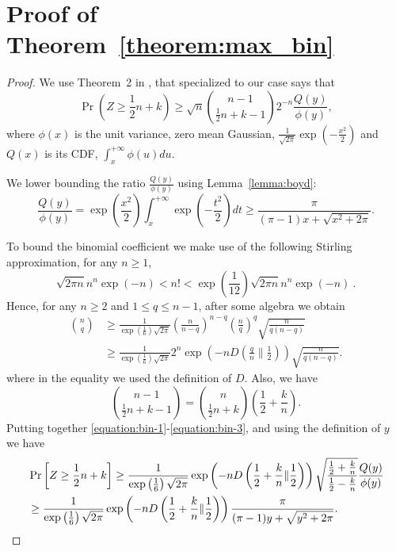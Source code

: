 \documentclass{article}
\begin{document}



\appendix

\section{Proof of Theorem~\ref{theorem:max_bin}}
\begin{proof}
We use Theorem~2 in \cite{McKay1989}, that specialized to our case says that
\begin{equation}
\label{equation:bin-1}
\Pr \left( Z \ge  \frac{1}{2} n + k  \right)
\ge \sqrt{n} \binom{n-1}{ \frac{1}{2} n + k -1} 2^{-n} \frac{Q(y)}{\phi(y)},
\end{equation}
where $\phi(x)$ is the unit variance, zero mean Gaussian, $\frac{1}{\sqrt{2 \pi}} \exp(-\frac{x^2}{2})$ and $Q(x)$ is its CDF, $\int_{x}^{+\infty} \phi(u) du$.

We lower bounding the ratio $\frac{Q(y)}{\phi(y)}$ using Lemma~\ref{lemma:boyd}:
\[
\frac{Q(y)}{\phi(y)}
= \exp\left(\frac{x^2}{2}\right) \int_{x}^{+\infty} \exp\left(-\frac{t^2}{2}\right) dt
\ge \frac{\pi}{(\pi-1)x+\sqrt{x^2+2 \pi}}.
\]

To bound the binomial coefficient we make use of the following Stirling approximation, for any $n\ge 1$,
\[
\sqrt{2 \pi n} n^n \exp(-n) < n! < \exp\left(\frac{1}{12}\right)\sqrt{2 \pi n} n^n \exp(-n)~.
\]
Hence, for any $n \ge 2$ and $1\le q \le n-1$, after some algebra we obtain
\begin{align*}
{n \choose q}
& \ge \frac{1}{\exp\left(\frac{1}{6}\right) \sqrt{2 \pi}} \left(\frac{n}{n-q}\right)^{n-q} \left(\frac{n}{q}\right)^{q} \sqrt{\frac{n}{q(n-q)}} \\
& \ge \frac{1}{\exp\left(\frac{1}{6}\right) \sqrt{2 \pi}} 2^n \exp\left(-n D\left(\frac{q}{n} \| \frac{1}{2}\right)\right) \sqrt{\frac{n}{q(n-q)}}.
\end{align*}
where in the equality we used the definition of $D$.
Also, we have
\begin{equation}
\label{equation:bin-3}
{n-1 \choose \frac{1}{2} n + k - 1} = {n \choose \frac{1}{2} n + k} \left(\frac{1}{2} + \frac{k}{n}\right) .
\end{equation}
Putting together \eqref{equation:bin-1}-\eqref{equation:bin-3}, and using the definition of $y$ we have
\begin{align*}
&\Pr\left[ Z \ge \frac{1}{2} n + k \right]
\ge \frac{1}{\exp\left(\frac{1}{6}\right) \sqrt{2 \pi}} \exp\left(-n D\left(\frac{1}{2}+\frac{k}{n} \| \frac{1}{2}\right)\right) \sqrt{\frac{\frac{1}{2} + \frac{k}{n}}{\frac{1}{2}-\frac{k}{n}}}  \frac{Q(y)}{\phi(y)} \\
&\ge \frac{1}{\exp\left(\frac{1}{6}\right) \sqrt{2 \pi}} \exp\left(-n D\left(\frac{1}{2}+\frac{k}{n} \| \frac{1}{2}\right)\right) \frac{\pi}{(\pi-1)y+\sqrt{y^2+2 \pi}}. \qedhere
\end{align*}
\end{proof}
\end{document}
